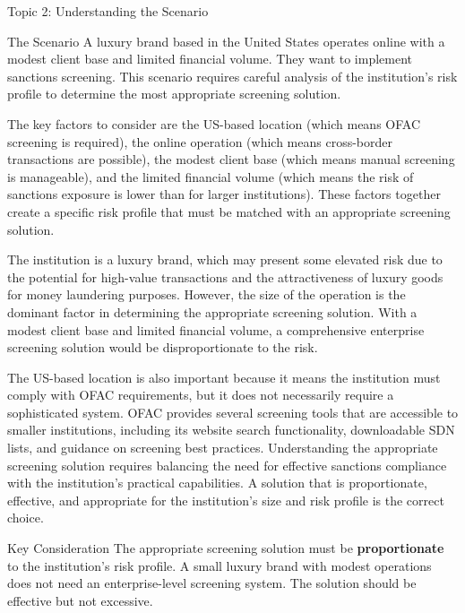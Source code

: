 \documentclass[5pt]{beamer}
\begin{document}
	\begin{frame}{Topic 2: Understanding the Scenario}
		\begin{block}{\tiny The Scenario}
			\tiny A luxury brand based in the United States operates online with a modest client base and limited financial volume. They want to implement sanctions screening. This scenario requires careful analysis of the institution's risk profile to determine the most appropriate screening solution.
			
			The key factors to consider are the US-based location (which means OFAC screening is required), the online operation (which means cross-border transactions are possible), the modest client base (which means manual screening is manageable), and the limited financial volume (which means the risk of sanctions exposure is lower than for larger institutions). These factors together create a specific risk profile that must be matched with an appropriate screening solution.
			
			The institution is a luxury brand, which may present some elevated risk due to the potential for high-value transactions and the attractiveness of luxury goods for money laundering purposes. However, the size of the operation is the dominant factor in determining the appropriate screening solution. With a modest client base and limited financial volume, a comprehensive enterprise screening solution would be disproportionate to the risk.
			
			The US-based location is also important because it means the institution must comply with OFAC requirements, but it does not necessarily require a sophisticated system. OFAC provides several screening tools that are accessible to smaller institutions, including its website search functionality, downloadable SDN lists, and guidance on screening best practices. Understanding the appropriate screening solution requires balancing the need for effective sanctions compliance with the institution's practical capabilities. A solution that is proportionate, effective, and appropriate for the institution's size and risk profile is the correct choice.
		\end{block}
		
		\begin{alertblock}{Key Consideration}
			\tiny The appropriate screening solution must be \textbf{proportionate} to the institution's risk profile. A small luxury brand with modest operations does not need an enterprise-level screening system. The solution should be effective but not excessive.
		\end{alertblock}
	\end{frame}
	
\end{document}
